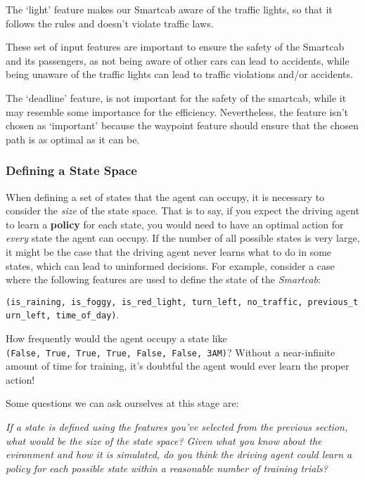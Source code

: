\documentclass[11pt]{article}
\begin{document}
The `light' feature makes our Smartcab aware of the traffic lights, so
that it follows the rules and doesn't violate traffic laws.

These set of input features are important to ensure the safety of the
Smartcab and its passengers, as not being aware of other cars can lead
to accidents, while being unaware of the traffic lights can lead to
traffic violations and/or accidents.

The `deadline' feature, is not important for the safety of the smartcab,
while it may resemble some importance for the efficiency. Nevertheless,
the feature isn't chosen as `important' because the waypoint feature
should ensure that the chosen path is as optimal as it can be.

    \hypertarget{defining-a-state-space}{%
\subsubsection{Defining a State Space}\label{defining-a-state-space}}

When defining a set of states that the agent can occupy, it is necessary
to consider the \emph{size} of the state space. That is to say, if you
expect the driving agent to learn a \textbf{policy} for each state, you
would need to have an optimal action for \emph{every} state the agent
can occupy. If the number of all possible states is very large, it might
be the case that the driving agent never learns what to do in some
states, which can lead to uninformed decisions. For example, consider a
case where the following features are used to define the state of the
\emph{Smartcab}:

\texttt{(\textquotesingle{}is\_raining\textquotesingle{},\ \textquotesingle{}is\_foggy\textquotesingle{},\ \textquotesingle{}is\_red\_light\textquotesingle{},\ \textquotesingle{}turn\_left\textquotesingle{},\ \textquotesingle{}no\_traffic\textquotesingle{},\ \textquotesingle{}previous\_turn\_left\textquotesingle{},\ \textquotesingle{}time\_of\_day\textquotesingle{})}.

How frequently would the agent occupy a state like
\texttt{(False,\ True,\ True,\ True,\ False,\ False,\ \textquotesingle{}3AM\textquotesingle{})}?
Without a near-infinite amount of time for training, it's doubtful the
agent would ever learn the proper action!

    Some questions we can ask ourselves at this stage are:

\emph{If a state is defined using the features you've selected from the
previous section, what would be the size of the state space? Given what
you know about the evironment and how it is simulated, do you think the
driving agent could learn a policy for each possible state within a
reasonable number of training trials?}
\end{document}
